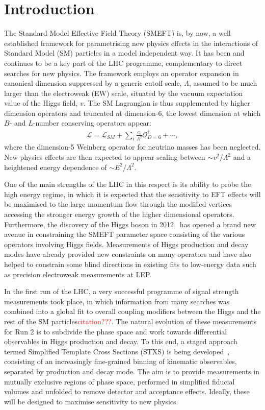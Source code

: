 \documentclass[11pt]{cernrep}
\newcommand{\red}[1]{\textcolor{red}{#1}}
\begin{document}
\section{Introduction}
\label{sec:intro}
The Standard Model Effective Field Theory (SMEFT) is, by now, a well established framework for parametrising new physics effects in the interactions of Standard Model (SM) particles in a model independent way. It has been and continues to be a key part of the LHC programme, complementary to direct searches for new physics. The framework employs an operator expansion in canonical dimension suppressed by a generic cutoff scale, $\Lambda$, assumed to be much larger than the electroweak (EW) scale, situated by the vacuum expectation value of the Higgs field, $v$. The SM Lagrangian is thus supplemented by higher dimension operators and truncated at dimension-6, the lowest dimension at which $B$- and $L$-number conserving operators appear:
\begin{align}
    \mathcal{L}=\mathcal{L}_{SM}+\sum_i \frac{c_i}{\Lambda^2}\mathcal{O}^i_{D=6}+\cdots,
\end{align} 
where the dimension-5 Weinberg operator for neutrino masses has been neglected. New physics effects are then expected to appear scaling between $\sim v^2/\Lambda^2$ and a heightened energy dependence of $\sim E^2/\Lambda^2$.

One of the main strengths of the LHC in this respect is its ability to probe the high energy regime, in which it is expected that the sensitivity to EFT effects will be maximised to the large momentum flow through the modified  vertices accessing the stronger energy growth of the higher dimensional operators. Furthermore, the discovery of the Higgs boson in 2012~\cite{Aad:2012tfa,Chatrchyan:2012xdj} has opened a brand new avenue in constraining the SMEFT parameter space consisting of the various operators involving Higgs fields. Measurements of Higgs production and decay modes have already provided new constraints on many operators and have also helped to constrain some blind directions in existing fits to low-energy data such as precision electroweak measurements at LEP. 

In the first run of the LHC, a very successful programme of signal strength measurements took place, in which information from many searches was combined into a global fit to overall coupling modifiers between the Higgs and the rest of the SM particles\red{citation???}. The natural evolution of these measurements for Run 2 is to subdivide the phase space and work towards differential observables in Higgs production and decay. To this end, a staged approach termed Simplified Template Cross Sections (STXS) is being developed~\cite{deFlorian:2016spz}, consisting of an increasingly fine-grained binning of kinematic observables, separated by production and decay mode. The aim is to provide measurements in mutually exclusive regions of phase space, performed in simplified fiducial volumes and unfolded to remove detector and acceptance effects. Ideally, these will be designed to maximise sensitivity to new physics.
\end{document}
